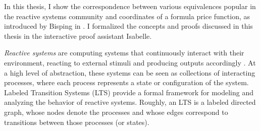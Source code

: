 %
\begin{isabellebody}%
%
%
\isadelimtheory
%
\endisadelimtheory
%
\isatagtheory
%
\endisatagtheory
{\isafoldtheory}%
%
\isadelimtheory
%
\endisadelimtheory
%
\isadelimdocument
%
\endisadelimdocument
%
\isatagdocument
%
\isamarkuptrue%
%
\endisatagdocument
{\isafolddocument}%
%
\isadelimdocument
%
\endisadelimdocument
%
\begin{isamarkuptext}%
In this thesis, I show the correspondence between various equivalences popular in the reactive
systems community and coordinates of a formula price function, as introduced by Bisping in \cite{bisping2023process}. I formalized the concepts and proofs discussed in this thesis in the interactive proof assistant Isabelle.

\textit{Reactive systems} are computing systems that continuously interact with their environment, reacting to external stimuli and producing outputs accordingly \cite{harel85}.
At a high level of abstraction, these systems can be seen as collections of interacting processes, where each process represents a state or configuration of the system. 
Labeled Transition Systems (LTS) \cite{keller76} provide a formal framework for modeling and analyzing the behavior of reactive systems. Roughly, an LTS is a labeled directed graph, whose nodes denote the processes
and whose edges correspond to transitions between those processes (or states).


\end{isamarkuptext}
\end{isabellebody}

